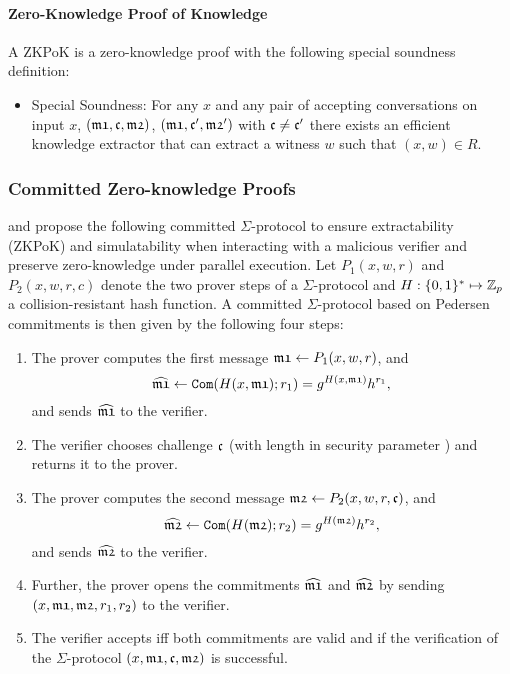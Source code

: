 \paragraph{Zero-Knowledge Proof of Knowledge}
A \ac{ZKPoK} is a zero-knowledge proof with the following special soundness definition:
\begin{itemize}
	\item Special Soundness: For any $x$ and any pair of accepting conversations on input $x$, $(\mathfrak{m1}, \mathfrak{c}, \mathfrak{m2})$, $(\mathfrak{m1}, \mathfrak{c}', \mathfrak{m2}')$ with $\mathfrak{c}\not= \mathfrak{c}'$ there exists an efficient knowledge extractor \Ext that can extract a witness $w$ such that $(x,w)\in R$.
\end{itemize}

\subsubsection{Committed Zero-knowledge Proofs} \label{sec:commited-sigma}
\citet{Damgard00} and \citet{JareckiL00} propose the following committed $\Sigma$-protocol to ensure extractability (\ac{ZKPoK}) and simulatability when interacting with a malicious verifier and preserve zero-knowledge under parallel execution.
Let $P_1(x,w,r)$ and $P_2(x,w,r,c)$ denote the two prover steps of a $\Sigma$-protocol and $H:\{0,1\}^\ast\mapsto\mathbb{Z}_p$ a collision-resistant hash function.
A committed $\Sigma$-protocol based on Pedersen commitments is then given by the following four steps:
\begin{enumerate}
  \item The prover computes the first message $\mathfrak{m1}\gets P_1(x,w,r)$, and
  \[\widehat{\mathfrak{m1}}\gets\mathtt{Com}(H(x,\mathfrak{m1}); r_1)=g^{H(x,\mathfrak{m1})}h^{r_1},\]
  and sends $\widehat{\mathfrak{m1}}$ to the verifier.
  \item The verifier chooses challenge $\mathfrak{c}$ (with length in security parameter \secpar) and returns it to the prover.
  \item The prover computes the second message $\mathfrak{m2}\gets P_2(x,w,r,\mathfrak{c})$, and 
  \[\widehat{\mathfrak{m2}}\gets\mathtt{Com}(H(\mathfrak{m2}); r_2)=g^{H(\mathfrak{m2})}h^{r_2},\]
   and sends $\widehat{\mathfrak{m2}}$ to the verifier.
  \item Further, the prover opens the commitments $\widehat{\mathfrak{m1}}$ and $\widehat{\mathfrak{m2}}$ by sending $(x,\mathfrak{m1},\mathfrak{m2},r_1,r_2)$ to the verifier.
  \item The verifier accepts iff both commitments are valid and if the verification of the $\Sigma$-protocol $(x,\mathfrak{m1},\mathfrak{c},\mathfrak{m2})$ is successful.
\end{enumerate}

